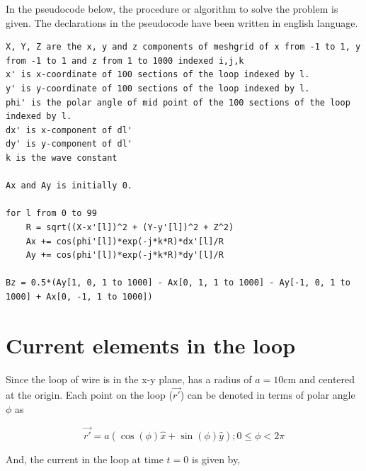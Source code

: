 \documentclass[12pt, a4paper]{article}
\begin{document}
In the pseudocode below, the procedure or algorithm to solve the problem is given. The declarations in the pseudocode have been written in english language.

\begin{lstlisting}
X, Y, Z are the x, y and z components of meshgrid of x from -1 to 1, y from -1 to 1 and z from 1 to 1000 indexed i,j,k
x' is x-coordinate of 100 sections of the loop indexed by l.
y' is y-coordinate of 100 sections of the loop indexed by l.
phi' is the polar angle of mid point of the 100 sections of the loop indexed by l.
dx' is x-component of dl'
dy' is y-component of dl'
k is the wave constant

Ax and Ay is initially 0.

for l from 0 to 99
    R = sqrt((X-x'[l])^2 + (Y-y'[l])^2 + Z^2)
    Ax += cos(phi'[l])*exp(-j*k*R)*dx'[l]/R
    Ay += cos(phi'[l])*exp(-j*k*R)*dy'[l]/R

Bz = 0.5*(Ay[1, 0, 1 to 1000] - Ax[0, 1, 1 to 1000] - Ay[-1, 0, 1 to 1000] + Ax[0, -1, 1 to 1000])
\end{lstlisting}


\section{Current elements in the loop}

Since the loop of wire is in the x-y plane, has a radius of $a = 10$cm and centered at the origin. Each point on the loop ($\vec{r'}$) can be denoted in terms of polar angle $\phi$ as

\begin{equation*}
\vec{r'} = a (\cos(\phi) \hat{x} + \sin(\phi) \hat{y} ); 0 \leq \phi < 2\pi
\end{equation*}

And, the current in the loop at time $t = 0$ is given by,
\end{document}
